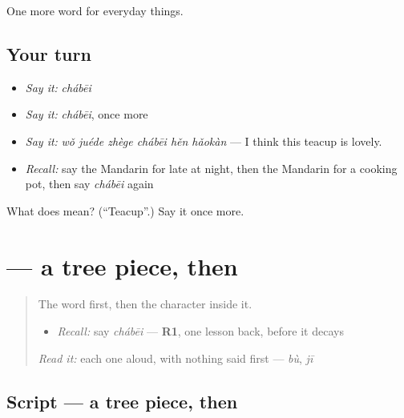 \begin{grammarlens}[title={What you've built}]
One more word for everyday things.
\end{grammarlens}

\subsection*{Your turn}
\begin{itemize}
\raggedright
  \item \emph{Say it:} \emph{chábēi}
  \item \emph{Say it:} \emph{chábēi}, once more
  \item \emph{Say it:} \emph{wǒ juéde zhège chábēi hěn hǎokàn} — I think this teacup is lovely.
  \item \emph{Recall:} say the Mandarin for late at night, then the Mandarin for a cooking pot, then say \emph{chábēi} again
\end{itemize}

\begin{tcolorbox}[breakable,colback=teal!4,colframe=teal!35!black,title={Before you move on}]
What does  mean? (\textquotedblleft{}Teacup\textquotedblright{}.) Say it once more.
\end{tcolorbox}
\section[\texorpdfstring{\zh{杯} (bēi)}{杯 (bēi)}]{ — a tree piece, then }

\label{lesson:ZH-W170-bei-cup}



\begin{quote}
The word first, then the character inside it.

\begin{itemize}
\raggedright
  \item \emph{Recall:} say \emph{chábēi} — \textbf{R1}, one lesson back, before it decays
\end{itemize}

\begin{quote}
 
\end{quote}

\emph{Read it:} each one aloud, with nothing said first — \emph{bù}, \emph{jī}
\end{quote}

\subsection*{Script — a tree piece, then }

